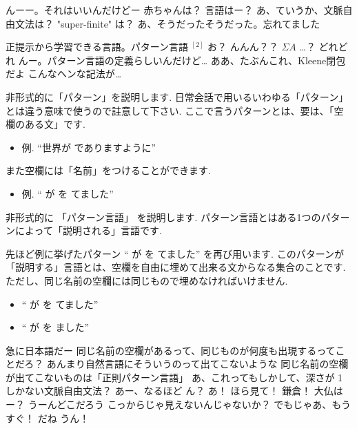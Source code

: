 \PAUSE

\YUKARI んーー。それはいいんだけどー
\YUKARI 赤ちゃんは？ 言語はー？
\YUI あ、ていうか、文脈自由文法は？ "super-finite" は？
\YUZUKO あ、そうだったそうだった。忘れてました

\PAUSE

\YUI 正提示から学習できる言語。パターン言語 ${}^{[2]}$
\YUZUKO お？
\YUI んんん？？ $\Sigma A$ …？
\YUZUKO どれどれ
\YUI んー。パターン言語の定義らしいんだけど…
\YUZUKO ああ、たぶんこれ、Kleene閉包だよ
\YUI こんなヘンな記法が…

\begin{boxnote}
    非形式的に「パターン」を説明します.
    日常会話で用いるいわゆる「パターン」とは違う意味で使うので註意して下さい.
    ここで言うパターンとは、要は、「空欄のある文」です.
    \begin{itemize}
        \item 例. ``世界が \fbox{　　} でありますように''
    \end{itemize}
    また空欄には「名前」をつけることができます.
    \begin{itemize}
        \item 例. `` が  を  てました''
    \end{itemize}
\end{boxnote}

\begin{boxnote}
    非形式的に 「パターン言語」 を説明します.
    パターン言語とはある1つのパターンによって「説明される」言語です.

    先ほど例に挙げたパターン `` が  を  てました'' を再び用います.
    このパターンが「説明する」言語とは、空欄を自由に埋めて出来る文からなる集合のことです.
    ただし、同じ名前の空欄には同じもので埋めなければいけません.
    \begin{itemize}
        \setlength{\itemsep}{0mm}
        \item `` が  を  てました''
        \item `` が  を  ました''
    \end{itemize}
\end{boxnote}

\PAUSE

\YUKARI 急に日本語だー
\YUI 同じ名前の空欄があるって、同じものが何度も出現するってことだろ？
\YUI あんまり自然言語にそういうのって出てこないような
\YUKARI 同じ名前の空欄が出てこないものは「正則パターン言語」
\YUZUKO あ、これってもしかして、深さが 1 しかない文脈自由文法？
\YUI あー、なるほど
\YUI ん？
\YUZUKO あ！ ほら見て！ 鎌倉！
\YUKARI 大仏はー？
\YUZUKO うーんどこだろう
\YUI こっからじゃ見えないんじゃないか？
\YUKARI でもじゃあ、もうすぐ！ だね
\YUZUKO うん！

